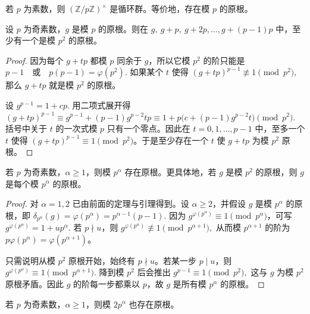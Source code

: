\documentclass[oneside]{AJbook}
\newcommand{\Z}{\mathbb Z}
\newcommand{\U}[1]{(\Z/#1\Z)^\times}
\begin{document}
\begin{theorem}[模素数存在原根]
若 $p$ 为素数，则 $\U p$ 是循环群。等价地，存在模 $p$ 的原根。
\end{theorem}

\begin{lemma}[从模 $p$ 提升到模 $p^2$]
设 $p$ 为奇素数，$g$ 是模 $p$ 的原根。则在
\(
  g,\ g+p,\ g+2p,\ldots,g+(p-1)p
\)
中，至少有一个是模 $p^2$ 的原根。
\end{lemma}

\begin{proof}
因为每个 $g+tp$ 都模 $p$ 同余于 $g$，所以它模 $p^2$ 的阶只能是
\(
  p-1\quad\text{或}\quad p(p-1)=\varphi(p^2).
\)
如果某个 $t$ 使得
\(
  (g+tp)^{p-1}\not\equiv 1\pmod {p^2},
\)
那么 $g+tp$ 就是模 $p^2$ 的原根。

设
\(
  g^{p-1}=1+cp.
\)
用二项式展开得
\(
  (g+tp)^{p-1}
  \equiv
  g^{p-1}+(p-1)g^{p-2}tp
  \equiv
  1+p\bigl(c+(p-1)g^{p-2}t\bigr)
  \pmod {p^2}.
\)
括号中关于 $t$ 的一次式模 $p$ 只有一个零点。因此在 $t=0,1,\ldots,p-1$ 中，至多一个 $t$ 使得
$(g+tp)^{p-1}\equiv 1\pmod {p^2}$。于是至少存在一个 $t$ 使 $g+tp$ 为模 $p^2$ 原根。
\end{proof}

\begin{theorem}[奇素数幂模原根]
若 $p$ 为奇素数，$\alpha\ge 1$，则模 $p^\alpha$ 存在原根。更具体地，若 $g$ 是模 $p^2$ 的原根，则 $g$ 是每个模
$p^\alpha$ 的原根。
\end{theorem}

\begin{proof}
对 $\alpha=1,2$ 已由前面的定理与引理得到。设 $\alpha\ge 2$，并假设 $g$ 是模 $p^\alpha$ 的原根，即
\(
  \delta_{p^\alpha}(g)=\varphi(p^\alpha)=p^{\alpha-1}(p-1).
\)
因为 $g^{\varphi(p^\alpha)}\equiv 1\pmod {p^\alpha}$，可写
\(
  g^{\varphi(p^\alpha)}=1+up^\alpha.
\)
若 $p\nmid u$，则
\(
  g^{\varphi(p^\alpha)}\not\equiv 1\pmod {p^{\alpha+1}},
\)
从而模 $p^{\alpha+1}$ 的阶为 $p\varphi(p^\alpha)=\varphi(p^{\alpha+1})$。

只需说明从模 $p^2$ 原根开始，始终有 $p\nmid u$。若某一步 $p\mid u$，则
\(
  g^{\varphi(p^\alpha)}\equiv 1\pmod {p^{\alpha+1}}.
\)
降到模 $p^2$ 后会推出
\(
  g^{p-1}\equiv 1\pmod {p^2},
\)
这与 $g$ 为模 $p^2$ 原根矛盾。因此 $g$ 的阶每一步都乘以 $p$，故 $g$ 是所有模 $p^\alpha$ 的原根。
\end{proof}

\begin{corollary}
若 $p$ 为奇素数，$\alpha\ge 1$，则模 $2p^\alpha$ 也存在原根。
\end{corollary}
\end{document}
